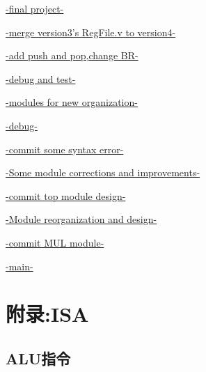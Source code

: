 \documentclass{article}
\begin{document}
\href{https://github.com/lyh031026huahuo1234/FPGA/commit/c23338e3e2d618f0f60e147ae3171259653f18c0}{-final project-} 

\href{https://github.com/lyh031026huahuo1234/FPGA/commit/5dc46de748a9b6c0a2f98d666d9cafa90616ae1c}{-merge version3's RegFile.v to version4-} 

\href{https://github.com/lyh031026huahuo1234/FPGA/commit/8ab835e84b8704036dd17177fd21a39e7fc7dbb3}{-add push and pop,change BR-}

\href{https://github.com/lyh031026huahuo1234/FPGA/commit/6f65d11591ff371db7cb10cd4e8afc1c09ef3051}{-debug and test-}


\href{https://github.com/lyh031026huahuo1234/FPGA/commit/05c2abe0720445d591cb86a88e2cd1ae73d90c9c}{-modules for new organization-}

\href{https://github.com/lyh031026huahuo1234/FPGA/commit/75b1552252936fcbecede27b80b03d2d783391ce}{-debug-}

\href{https://github.com/lyh031026huahuo1234/FPGA/commit/ee0a76e611e4321e34963ad228e82693b8a2db38}{-commit some syntax error-}

\href{https://github.com/lyh031026huahuo1234/FPGA/commit/121aa80b3b038370c69262b26d2ba4924143cab1}{-Some module corrections and improvements-}

\href{https://github.com/lyh031026huahuo1234/FPGA/commit/7aa8c0ca0500cd12a02199083dd7ad8dca750284}{-commit top module design-}

\href{https://github.com/lyh031026huahuo1234/FPGA/commit/035580ca64eb6be3e56a62e0d6f96c69ec52480c}{-Module reorganization and design-}

\href{https://github.com/lyh031026huahuo1234/FPGA/commit/b7df2657a48e5a9d9b2984d78ff0564daa588588}{-commit MUL module-}

\href{https://github.com/lyh031026huahuo1234/FPGA/commit/6cd80229a412af0df88642db99a90405ca530a39}{-main-}

\section{附录:ISA}
\subsection{ALU指令}
\end{document}
